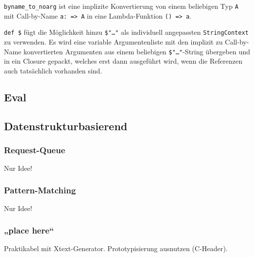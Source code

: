 \lstinline|byname_to_noarg| ist eine implizite Konvertierung von einem
beliebigen Typ \lstinline|A| mit Call-by-Name
\lstinline|a: => A| in eine Lambda-Funktion \lstinline|() => a|.

\lstinline|def $| fügt die Möglichkeit hinzu \lstinline|$"…"| als individuell angepassten \lstinline|StringContext| zu verwenden. Es wird eine variable 
Argumentenliste mit den implizit zu Call-by-Name konvertierten Argumenten
aus einem beliebigen \lstinline|$"…"|-String übergeben und in ein Closure gepackt,
welches erst dann ausgeführt wird, wenn die Referenzen auch tatsächlich
vorhanden sind.



\subsection{Eval}

\subsection{Datenstrukturbasierend}

\subsubsection{Request-Queue}

Nur Idee!

\subsubsection{Pattern-Matching}

Nur Idee!

\subsubsection{„place here“}

Praktikabel mit Xtext-Generator. Prototypisierung ausnutzen (C-Header).
